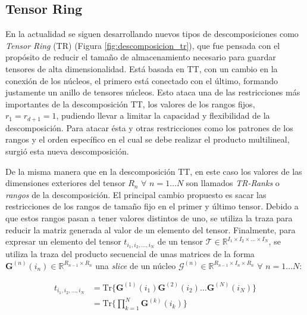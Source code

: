 \documentclass[spanish]{article}
\theoremstyle{definition}
\theoremstyle{remark}
\numberwithin{equation}{section}
\numberwithin{equation}{section} %
\begin{document}
\subsection{Tensor Ring}
\label{ssec:tensor_ring}
En la actualidad se siguen desarrollando nuevos tipos de descomposiciones como \textit{Tensor Ring} (TR) \cite{zhao2016tensor} (Figura \ref{fig:descomposicion_tr}), que fue pensada con el propósito de reducir el tamaño de almacenamiento necesario para guardar tensores de alta dimensionalidad. Está basada en TT, con un cambio en la conexión de los  núcleos, el primero está conectado con el último, formando justamente un anillo de tensores núcleos. Esto ataca una de las restricciones más importantes de la descomposición TT, los valores de los rangos fijos, $r_1=r_{d+1}=1$, pudiendo llevar a limitar la capacidad y flexibilidad de la descomposición. Para atacar ésta y otras restricciones como los patrones de los rangos y el orden específico en el cual se debe realizar el producto multilineal, surgió esta nueva descomposición.  \par
 De la misma manera que en la descomposición TT, en este caso los valores de las dimensiones exteriores del tensor $R_n$ $\forall$ $n=1 \ldots N$ son llamados \textit{TR-Ranks} o \textit{rangos} de la descomposición. El principal cambio propuesto es sacar las restricciones de los rangos de tamaño fijo en el primer y último tensor. Debido a que estos rangos pasan a tener valores distintos de uno, se utiliza la traza para reducir la matriz generada al valor de un elemento del tensor. Finalmente, para expresar un elemento del tensor $t_{i_1,i_2, \ldots ,i_N}$ de un tensor $\mathcal{T} \in \mathbb{R} ^{I_1 \times I_2 \times \ldots \times I_N}$, se utiliza la traza del producto secuencial de unas matrices de la forma $\boldsymbol{G}^{(n)}(i_n)\in \mathbb{R} ^{R_{n-1} \times R_n } $ una \textit{slice} de un núcleo $\mathcal{G}^{(n)} \in \mathbb{R} ^{R_{n-1}\times I_n \times R_n }$  $\forall$ $n=1 \ldots N$:  \par
\begin{equation}
\label{slice_representation_TR}
\begin{split}
t_{i_1,i_2, \ldots ,i_N}&
= \mathrm{Tr} \Big\{\boldsymbol{G}^{(1)}(i_1) \boldsymbol{G}^{(2)}(i_2) \ldots \boldsymbol{G}^{(N)}(i_N) \Big\}   \\
      &= \mathrm{Tr} \Bigg\{\prod_{k=1}^{N}\boldsymbol{G}^{(k)}(i_k) \Bigg\} 
\end{split}
\end{equation} \par
\end{document}
